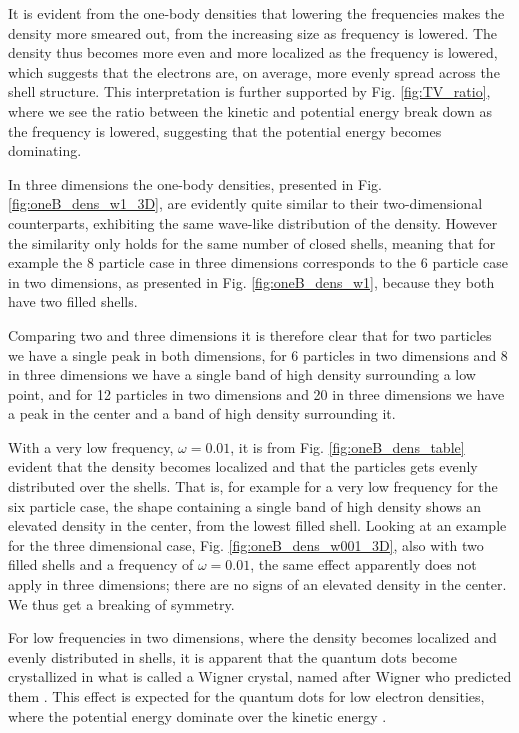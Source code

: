 	It is evident from the one-body densities that lowering the frequencies makes the density more smeared out, from the increasing size as frequency is lowered. The density thus becomes more even and more localized as the frequency is lowered, which suggests that the electrons are, on average, more evenly spread across the shell structure. This interpretation is further supported by Fig. \ref{fig:TV_ratio}, where we see the ratio between the kinetic and potential energy break down as the frequency is lowered, suggesting that the potential energy becomes dominating.

	In three dimensions the one-body densities, presented in Fig. \ref{fig:oneB_dens_w1_3D}, are evidently quite similar to their two-dimensional counterparts, exhibiting the same wave-like distribution of the density. However the similarity only holds for the same number of closed shells, meaning that for example the 8 particle case in three dimensions corresponds to the 6 particle case in two dimensions, as presented in Fig. \ref{fig:oneB_dens_w1}, because they both have two filled shells. 

	Comparing two and three dimensions it is therefore clear that for two particles we have a single peak in both dimensions, for 6 particles in two dimensions and 8 in three dimensions we have a single band of high density surrounding a low point, and for 12 particles in two dimensions and 20 in three dimensions we have a peak in the center and a band of high density surrounding it.

	With a very low frequency, $\omega=0.01$, it is from Fig. \ref{fig:oneB_dens_table} evident that the density becomes localized and that the particles gets evenly distributed over the shells. That is, for example for a very low frequency for the six particle case, the shape containing a single band of high density shows an elevated density in the center, from the lowest filled shell. Looking at an example for the three dimensional case, Fig. \ref{fig:oneB_dens_w001_3D}, also with two filled shells and a frequency of $\omega=0.01$, the same effect apparently does not apply in three dimensions; there are no signs of an elevated density in the center. We thus get a breaking of symmetry.

	For low frequencies in two dimensions, where the density becomes localized and evenly distributed in shells, it is apparent that the quantum dots become crystallized in what is called a Wigner crystal, named after Wigner who predicted them \cite{wigner1934interaction}. This effect is expected for the quantum dots for low electron densities, where the potential energy dominate over the kinetic energy \cite{Landman07}. 

